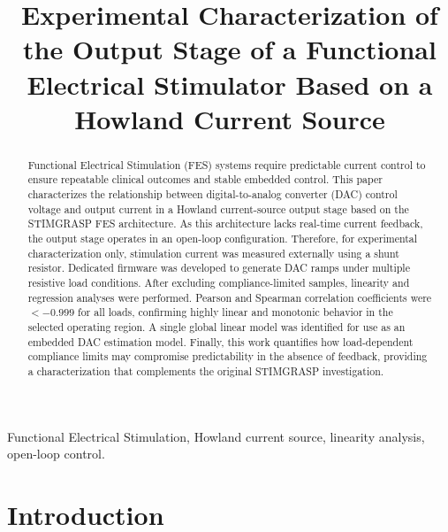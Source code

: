 \documentclass[conference]{IEEEtran}
\begin{document}
\raggedbottom

\title{Experimental Characterization of the Output Stage of a Functional Electrical Stimulator Based on a Howland Current Source}

\author{
}
\maketitle

\begin{abstract}
Functional Electrical Stimulation (FES) systems require predictable current control to ensure repeatable clinical outcomes and stable embedded control. This paper characterizes the relationship between digital-to-analog converter (DAC) control voltage and output current in a Howland current-source output stage based on the STIMGRASP FES architecture. As this architecture lacks real-time current feedback, the output stage operates in an open-loop configuration. Therefore, for experimental characterization only, stimulation current was measured externally using a shunt resistor. Dedicated firmware was developed to generate DAC ramps under multiple resistive load conditions. After excluding compliance-limited samples, linearity and regression analyses were performed. Pearson and Spearman correlation coefficients were $<-0.999$ for all loads, confirming highly linear and monotonic behavior in the selected operating region. A single global linear model was identified for use as an embedded DAC estimation model. Finally, this work quantifies how load-dependent compliance limits may compromise predictability in the absence of feedback, providing a characterization that complements the original STIMGRASP investigation.
\end{abstract}


\begin{IEEEkeywords}
Functional Electrical Stimulation, Howland current source, linearity analysis, open-loop control.
\end{IEEEkeywords}

\section{Introduction}
\end{document}
